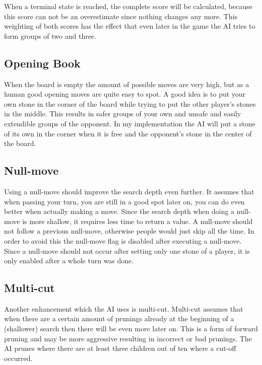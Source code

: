 \documentclass[a4paper]{article}
\begin{document}
When a terminal state is reached, the complete score will be calculated, because this score can not be an overestimate since nothing changes any more. This weighting of both scores has the effect that even later in the game the AI tries to form groups of two and three.

\subsection{Opening Book}
When the board is empty the amount of possible moves are very high, but as a human good opening moves are quite easy to spot. A good idea is to put your own stone in the corner of the board while trying to put the other player's stones in the middle. This results in safer groups of your own and unsafe and easily extendible groups of the opponent.
In my implementation the AI will put a stone of its own in the corner when it is free and the opponent's stone in the center of the board.

\subsection{Null-move}
Using a null-move should improve the search depth even further. It assumes that when passing your turn, you are still in a good spot later on, you can do even better when actually making a move. Since the search depth when doing a null-move is more shallow, it requires less time to return a value. A null-move should not follow a previous null-move, otherwise people would just skip all the time. In order to avoid this the null-move flag is disabled after executing a null-move. Since a null-move should not occur after setting only one stone of a player, it is only enabled after a whole turn was done.

\subsection{Multi-cut}
Another enhancement which the AI uses is multi-cut. Multi-cut assumes that when there are a certain amount of prunings already at the beginning of a (shallower) search then there will be even more later on. This is a form of forward pruning and may be more aggressive resulting in incorrect or bad prunings. The AI prunes where there are at least three children out of ten where a cut-off occurred.
\end{document}
